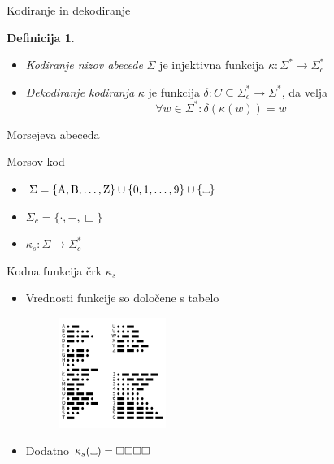 \documentclass{beamer}
\theoremstyle{definition} %
\newtheorem{definicija}{Definicija}[section]
\newcommand\Vtextvisiblespace[1][.3em]{%
\mbox{\kern.06em\vrule height.3ex}%
\vbox{\hrule width#1}%
\hbox{\vrule height.3ex}}
\begin{document}
\begin{frame}{Kodiranje in dekodiranje}
    \begin{definicija}
        \begin{itemize}
            \item \textit{Kodiranje nizov abecede} $ \Sigma $ je injektivna funkcija $ \kappa \colon \Sigma^* 
            \to \Sigma_c^* $
            \item<2-> \textit{Dekodiranje kodiranja} $ \kappa $ je funkcija 
            $ \delta \colon C \subseteq \Sigma^*_c \to \Sigma^* $, da velja
            \[
                \forall w \in \Sigma^* \colon \delta(\kappa(w)) = w
            \]
        \end{itemize}
    \end{definicija}
\end{frame}

\begin{frame}{Morsejeva abeceda}
    \begin{block}{Morsov kod}
        \begin{itemize}
            \item<2->  $ \Sigma = \{ \text{A},  \text{B}, \ldots, \text{Z} \} \cup \{ 0, 1, \ldots, 9 \}
            \cup \{ \Vtextvisiblespace[5pt] \} $
            \item<3-> $ \Sigma_c = \{ \cdot ,-, \Box \} $
            \item<4-> $ \kappa_s \colon \Sigma \to \Sigma_c^* $ \\ \phantom{}
        \end{itemize}
    \end{block}
\end{frame}

\begin{frame}
    \begin{block}{Kodna funkcija črk $ \kappa_s $}
        \begin{itemize}
            \item Vrednosti funkcije so določene s tabelo
            \begin{figure}[h]
                \centering
                \includegraphics[width=3.5cm]{International_Morse_Code.svg.png}
            \end{figure}
            \item Dodatno $ \kappa_s(\Vtextvisiblespace[5pt]) = \Box\Box\Box\Box $
        \end{itemize}
    \end{block}
\end{frame}
\end{document}
